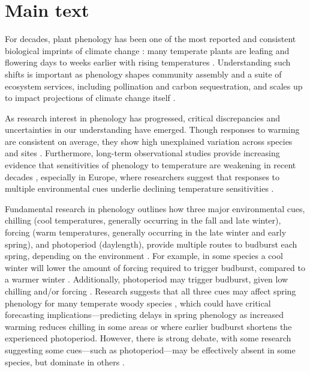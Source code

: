 \documentclass{article}
\begin{document}
\section* {Main text}

\par For decades, plant phenology has been one of the most reported and consistent biological imprints of climate change \emph{\citep{IPCC:2014sm}}: many temperate plants are leafing and flowering days to weeks earlier with rising temperatures \emph{\citep{millerrushing2008,menzel2006}}. Understanding such shifts is important as phenology shapes community assembly and a suite of ecosystem services, including pollination and carbon sequestration, and scales up to impact projections of climate change itself \emph{\citep{Cleland:2007or}}.
\par As research interest in phenology has progressed, critical discrepancies and uncertainties in our understanding have emerged. Though responses to warming are consistent on average, they show high unexplained variation across species and sites \emph{\citep{Wolkovich:2012n}}. Furthermore, long-term observational studies provide increasing evidence that sensitivities of phenology to temperature are weakening in recent decades \emph{\citep{Rutishauser:2008,yu2010}}, especially in Europe, where researchers suggest that responses to multiple environmental cues underlie declining temperature sensitivities \emph{\citep{fu2015}}.


\par Fundamental research in phenology outlines how three major environmental cues, chilling (cool temperatures, generally occurring in the fall and late winter), forcing (warm temperatures, generally occurring in the late winter and early spring), and photoperiod (daylength), provide multiple routes to budburst each spring, depending on the environment \emph{\citep{chuine2016}}. For example, in some species a cool winter will lower the amount of forcing required to trigger budburst, compared to a warmer winter \emph{\citep{harrington2015}}. Additionally, photoperiod may trigger budburst, given low chilling and/or forcing \emph{\citep{zohner2016,Basler:2014aa, Caffarra:2011b}}. Research suggests that all three cues may affect spring phenology for many temperate woody species \emph{\citep{flynn2018,Basler:2014aa,Caffarra:2011qf}}, which could have critical forecasting implications---predicting delays in spring phenology as increased warming reduces chilling in some areas \emph{\citep{fraga2019}} or where earlier budburst shortens the experienced photoperiod. However, there is strong debate, with some research suggesting some cues---such as photoperiod---may be effectively absent in some species, but dominate in others \emph{\citep{zohner2016,koerner2010a}}. 
\end{document}
